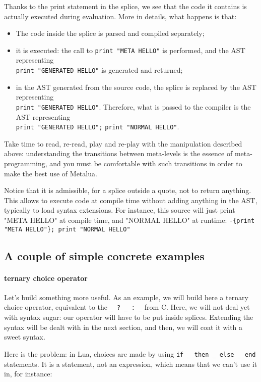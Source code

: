 Thanks to the print statement in the splice, we see that the code
it contains is actually executed during evaluation. More in details,
what happens is that:
\begin{itemize}
\item The code inside the splice is parsed and compiled separately;
\item it is executed: the call to \verb|print "META HELLO"| is
  performed, and the AST representing \\ \verb|print "GENERATED HELLO"| is
  generated and returned;
\item in the AST generated from the source code, the splice is
  replaced by the AST representing \\ \verb|print "GENERATED HELLO"|.
  Therefore, what is passed to the compiler is the AST representing\\
  \verb|print "GENERATED HELLO";| \verb|print "NORMAL HELLO"|.
\end{itemize}

Take time to read, re-read, play and re-play with the manipulation
described above: understanding the transitions between meta-levels is
the essence of meta-programming, and you must be comfortable with such
transitions in order to make the best use of Metalua.

Notice that it is admissible, for a splice outside a quote, not to
return anything. This allows to execute code at compile time without
adding anything in the AST, typically to load syntax extensions. For
instance, this source will just print "META HELLO" at compile time,
and "NORMAL HELLO" at runtime:
\verb|-{print "META HELLO"}; print "NORMAL HELLO"|

\subsection{A couple of simple concrete examples}

\paragraph{ternary choice operator}
Let's build something more useful. As an example, we will build here a
ternary choice operator, equivalent to the \verb|_ ? _ : _| from
C. Here, we will not deal yet with syntax sugar: our operator will
have to be put inside splices. Extending the syntax will be dealt with
in the next section, and then, we will coat it with a sweet syntax.

Here is the problem: in Lua, choices are made by using
\verb|if _ then _ else _ end| statements. It is a statement, not an
expression, which means that we can't use it in, for instance:

